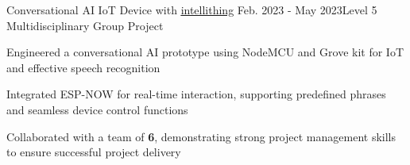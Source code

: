\begin{rSubsection}{Conversational AI IoT Device with \href{https://intellithing.tech/}{\underline{intellithing}}} {Feb. 2023 - May 2023}{Level 5 Multidisciplinary Group Project}{}
\item Engineered a conversational AI prototype using NodeMCU and Grove kit for IoT and effective speech recognition
\item Integrated ESP-NOW for real-time interaction, supporting predefined phrases and seamless device control functions
\item Collaborated with a team of \textbf{6}, demonstrating strong project management skills to ensure successful project delivery
\end{rSubsection}
